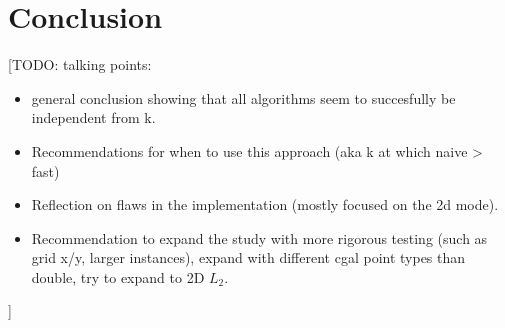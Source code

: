 \documentclass{article}
\newcommand{\todo}[1]{{\color{red}[#1]}}
\begin{document}
\section{Conclusion}
\todo{TODO: talking points:
    \begin{itemize}
        \item general conclusion showing that all algorithms seem to succesfully be
              independent from k.
        \item Recommendations for when to use this approach (aka k at which naive > fast)
        \item Reflection on flaws in the implementation (mostly focused on the 2d mode).
        \item Recommendation to expand the study with more rigorous testing (such as grid
              x/y, larger instances), expand with different cgal point types than double, try
              to expand to 2D $L_2$.
    \end{itemize}
}
\printbibliography
\end{document}
